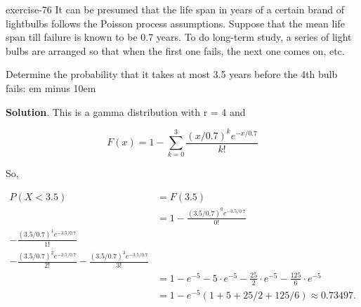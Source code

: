 \documentclass[10pt,]{book}
\newcommand{\fillin}[1]{\leavevmode\leaders\vrule height -1.2pt depth 1.5pt \hskip #1em minus #1em \null}
\numberwithin{equation}{section}
\newcommand{\lt}{<}
\newcommand{\amp}{&}
\begin{document}
\begin{inlineexercise}{}{exercise-76}%
\hypertarget{p-1141}{}%
It can be presumed that the life span in years of a certain brand of lightbulbs follows the Poisson process assumptions.  Suppose that the mean life span till failure is known to be 0.7 years. To do long-term study, a series of light bulbs are arranged so that when the first one fails, the next one comes on, etc.%
\par
\hypertarget{p-1142}{}%
Determine the probability that it takes at most 3.5 years before the 4th bulb fails:  \fillin{10}%
\par\smallskip%
\noindent\textbf{Solution}.\hypertarget{solution-38}{}\quad%
\hypertarget{p-1143}{}%
This is a gamma distribution with r = 4 and%
\par
\hypertarget{p-1144}{}%
%
\begin{equation*}
F(x) = 1 - \sum_{k=0}^3 \frac{ (x/0.7)^k e^{-x/0.7}}{k!}
\end{equation*}
%
\par
\hypertarget{p-1145}{}%
So,%
\par
\hypertarget{p-1146}{}%
%
\begin{equation*}
\begin{aligned}
P(X \lt 3.5) \amp  = F(3.5)\\
\amp  = 1 - \frac{ (3.5/0.7)^0 e^{-3.5/0.7}}{0!} \\ - \frac{ (3.5/0.7)^1 e^{-3.5/0.7}}{1!} \\ - \frac{ (3.5/0.7)^2 e^{-3.5/0.7}}{2!} - \frac{ (3.5/0.7)^3 e^{-3.5/0.7}}{3!}\\
\amp  = 1 - e^{-5} - 5 \cdot e^{-5} - \frac{25}{2} \cdot e^{-5} - \frac{125}{6} \cdot e^{-5}\\
\amp  = 1 - e^{-5} \left ( 1 + 5 + 25/2 + 125/6 \right ) \approx 0.73497.
\end{aligned}
\end{equation*}
%
\end{inlineexercise}
%
\par
\hypertarget{p-1147}{}%
\end{document}
